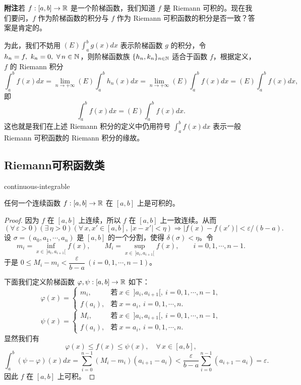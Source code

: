 \textbf{附注}\quad 若 \(f:[a,b]\to\mathbb{R}\) 是一个阶梯函数，我们知道 \(f\) 是 Riemann 可积的。现在我们要问，\(f\) 作为阶梯函数的积分与 \(f\) 作为 Riemann 可积函数的积分是否一致？答案是肯定的。

为此，我们不妨用 \((E)\displaystyle\int_a^b g(x)dx\) 表示阶梯函数 \(g\) 的积分，令 \(h_n=f,\ k_n=0,\ \forall\,n\in\N\)，则阶梯函数族 \(\{h_n,k_n\}_{n\in\mathbb{N}}\) 适合于函数 \(f\)，根据定义，\(f\) 的 Riemann 积分
\[
\int_a^b f(x)dx=\lim_{n\to+\infty}(E)\int_a^b h_n(x)dx=\lim_{n\to+\infty}(E)\int_a^b f(x)dx=(E)\int_a^b f(x)dx,
\]
即
\[
\int_a^b f(x)dx=(E)\int_a^b f(x)dx.
\]
这也就是我们在上述 Riemann 积分的定义中仍用符号 \(\displaystyle\int_a^b f(x)dx\) 表示一般 Riemann 可积函数的 Riemann 积分的缘故。

\subsection{Riemann可积函数类}

\begin{mythm}{}{continuous-integrable}

	任何一个连续函数 \(f:[a,b]\to\mathbb{R}\) 在 \([a,b]\) 上是可积的。

\end{mythm}

\begin{proof}

	因为 \(f\) 在 \([a,b]\) 上连续，所以 \(f\) 在 \([a,b]\) 上一致连续。从而
	\[
	(\forall\,\varepsilon>0)(\exists\,\eta>0)(\forall\,x,x'\in[a,b],\ |x-x'|<\eta)\Longrightarrow|f(x)-f(x')|<\varepsilon/(b-a).
	\]
	设 \(\sigma=(a_0,a_1,\cdots,a_n)\) 是 \([a,b]\) 的一个分割，使得 \(\delta(\sigma)<\eta\)。令
	\[
	m_i=\inf_{x\in\ ]a_i,a_{i+1}[}f(x),\qquad M_i=\sup_{x\in\ ]a_i,a_{i+1}[}f(x),\qquad i=0,1,\cdots,n-1.
	\]
	于是 \(0\le M_i-m_i<\dfrac{\varepsilon}{b-a}\ (i=0,1,\cdots,n-1)\)。

	下面我们定义阶梯函数 \(\varphi,\psi:[a,b]\to\mathbb{R}\) 如下：
	\[
	\varphi(x)=\begin{cases} m_i, & \text{若}\ x\in\ ]a_i,a_{i+1}[,\ i=0,1,\cdots,n-1, \\ f(a_i), & \text{若}\ x=a_i,\ i=0,1,\cdots,n. \end{cases}
	\]
	\[
	\psi(x)=\begin{cases} M_i, & \text{若}\ x\in\ ]a_i,a_{i+1}[,\ i=0,1,\cdots,n-1, \\ f(a_i), & \text{若}\ x=a_i,\ i=0,1,\cdots,n. \end{cases}
	\]
	显然我们有
	\[
	\varphi(x)\le f(x)\le\psi(x),\quad\forall\,x\in[a,b],
	\]
	\[
	\int_a^b(\psi-\varphi)(x)dx=\sum_{i=0}^{n-1}(M_i-m_i)(a_{i+1}-a_i)<\frac{\varepsilon}{b-a}\sum_{i=0}^{n-1}(a_{i+1}-a_i)=\varepsilon.
	\]
	因此 \(f\) 在 \([a,b]\) 上可积。

\end{proof}

